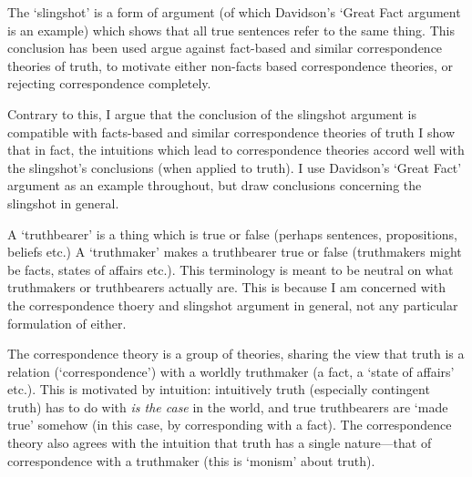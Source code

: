 



The `slingshot' is a form of argument (of which Davidson's `Great Fact argument is an example) which shows that all true sentences refer to the same thing.
This conclusion has been used argue against fact-based and similar correspondence theories of truth, to motivate either non-facts based correspondence theories, or rejecting correspondence completely.

Contrary to this, I argue that the conclusion of the slingshot argument is compatible with facts-based and similar correspondence theories of truth
I show that in fact, the intuitions which lead to correspondence theories accord well with the slingshot's conclusions (when applied to truth).
I use Davidson's `Great Fact' argument as an example throughout, but draw conclusions concerning the slingshot in general.

A `truthbearer' is a thing which is true or false (perhaps sentences, propositions, beliefs etc.)
A `truthmaker' makes a truthbearer true or false (truthmakers might be facts, states of affairs etc.).
This terminology is meant to be neutral on what truthmakers or truthbearers actually are.
This is because I am concerned with the correspondence thoery and slingshot argument in general, not any particular formulation of either.

The correspondence theory is a group of theories, sharing the view that truth is a relation (`correspondence') with a worldly truthmaker (a fact, a `state of affairs' etc.).
This is motivated by intuition: intuitively truth  (especially contingent truth) has to do with \emph{is the case} in the world, and true truthbearers are `made true' somehow (in this case, by corresponding with a fact).
The correspondence theory also agrees with the intuition that truth has a single nature---that of correspondence with a truthmaker (this is `monism' about truth).

